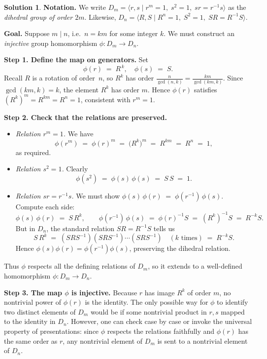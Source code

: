 \documentclass[12pt]{article}
\theoremstyle{definition} %
\newtheorem{solution}{Solution}
\theoremstyle{plain} %
\begin{document}
\begin{solution}
    \noindent
\textbf{Notation.}
We write \(D_m=\langle r,s \mid r^m=1,\; s^2=1,\; sr=r^{-1}s\rangle\) 
as the \emph{dihedral group of order \(2m\)}.  
Likewise, \(D_n=\langle R,S \mid R^n=1,\;S^2=1,\;SR=R^{-1}S\rangle\).

\medskip

\noindent
\textbf{Goal.}  Suppose \(m\mid n\), i.e.\ \(n = km\) for some integer \(k\).  
We must construct an \emph{injective} group homomorphism 
\(\phi : D_m \longrightarrow D_n\).  

\bigskip

\noindent
\textbf{Step 1. Define the map on generators.} 
Set
\[
\phi(r) \;=\; R^{\,k},
\quad
\phi(s) \;=\; S.
\]
Recall \(R\) is a rotation of order~\(n\), so \(R^k\) has order \(\frac{n}{\gcd(n,k)} = \frac{km}{\gcd(km,k)}\). 
Since \(\gcd(km,k)=k\), the element \(R^k\) has order \(m\).  
Hence \(\phi(r)\) satisfies \((R^k)^m = R^{km} = R^n = 1\), 
consistent with \(r^m=1\).  

\bigskip

\noindent
\textbf{Step 2. Check that the relations are preserved.}

\begin{itemize}
\item
\emph{Relation \(r^m=1\).}  
We have 
\[
\phi(r^m) 
\;=\; 
\phi(r)^m 
\;=\; 
\bigl(R^k\bigr)^m 
\;=\; 
R^{km} 
\;=\; 
R^n 
\;=\; 
1,
\]
as required.

\item
\emph{Relation \(s^2=1\).}  
Clearly 
\[
\phi(s^2)
\;=\;
\phi(s)\,\phi(s)
\;=\;
S\,S
\;=\;
1.
\]

\item
\emph{Relation \(sr=r^{-1}s\).}  
We must show 
\(\phi(s)\,\phi(r)\;=\;\phi(r^{-1})\,\phi(s)\).  
Compute each side:
\[
\phi(s)\,\phi(r)
\;=\;
S\,R^k,
\qquad
\phi(r^{-1})\,\phi(s)
\;=\;
\phi(r)^{-1}S
\;=\;
(R^k)^{-1}S
\;=\;
R^{-k}S.
\]
But in \(D_n\), the standard relation \(SR = R^{-1}S\) tells us 
\[
S\,R^k 
\;=\; 
(SRS^{-1})(SRS^{-1})\cdots (SRS^{-1}) \quad (k \text{ times})
\;=\;
R^{-k}S.
\]
Hence \(\phi(s)\phi(r)=\phi(r^{-1})\phi(s)\), 
preserving the dihedral relation.
\end{itemize}

Thus \(\phi\) respects all the defining relations of \(D_m\), so it extends 
to a well-defined homomorphism \(\phi\colon D_m\to D_n\).

\bigskip

\noindent
\textbf{Step 3. The map \(\phi\) is injective.}  
Because \(r\) has image \(R^k\) of order \(m\), no nontrivial power of \(\phi(r)\) is the identity.  
The only possible way for \(\phi\) to identify two distinct elements of \(D_m\) would be if 
some nontrivial product in \(r,s\) mapped to the identity in \(D_n\).  
However, one can check case by case or invoke the universal property of presentations: 
since \(\phi\) respects the relations faithfully and \(\phi(r)\) has the same order as \(r\), 
any nontrivial element of \(D_m\) is sent to a nontrivial element of \(D_n\).  


\end{solution}
\end{document}
